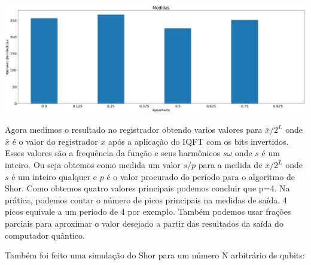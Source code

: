 \documentclass[12pt,a4paper]{article}
\begin{document}
\includegraphics[scale=0.25]{relatorio-shor1.png}

Agora medimos o resultado no registrador obtendo varios valores para $\bar{x}/2^{L}$ onde $\bar{x}$ é o valor do registrador $x$ após a aplicação do IQFT com os bits invertidos. Esses valores são a frequência da função e seus harmônicos $s\omega$ onde $s$ é um inteiro. Ou seja obtemos como medida um valor $s/p$ para a medida de $\bar{x}/2^{L}$ onde $s$ é um inteiro qualquer e $p$ é o valor procurado do período para o algoritmo de Shor. Como obtemos quatro valores principais podemos concluir que p=4. Na prática, podemos contar o número de picos principais na medidas de saída. 4 picos equivale a um periodo de 4 por exemplo. Também podemos usar frações parciais para aproximar o valor desejado a partir das resultados da saída do computador quântico.


Também foi feito uma simulação do Shor para um número N arbitrário de qubits:
\end{document}
